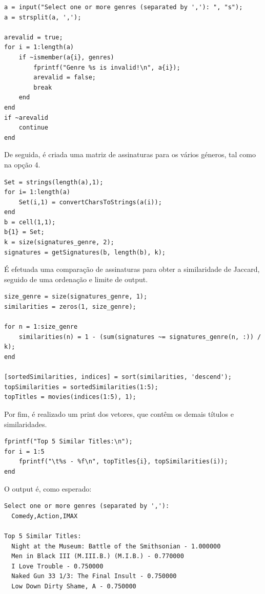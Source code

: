 \documentclass[portuguese, 11pt, a4paper,titlepage, oneside]{article}
\begin{document}
\begin{lstlisting}[style=Matlab-editor]
a = input("Select one or more genres (separated by ','): ", "s");
a = strsplit(a, ',');

arevalid = true;
for i = 1:length(a)
    if ~ismember(a{i}, genres)
        fprintf("Genre %s is invalid!\n", a{i});
        arevalid = false;
        break
    end
end
if ~arevalid
    continue
end
\end{lstlisting}

De seguida, é criada uma matriz de assinaturas para os vários géneros, tal como na opção 4.
\begin{lstlisting}[style=Matlab-editor]
Set = strings(length(a),1);
for i= 1:length(a)
    Set(i,1) = convertCharsToStrings(a(i));
end
b = cell(1,1);
b{1} = Set;
k = size(signatures_genre, 2);
signatures = getSignatures(b, length(b), k);
\end{lstlisting}

É efetuada uma comparação de assinaturas para obter a similaridade de Jaccard, seguido de uma ordenação e limite de output.
\begin{lstlisting}[style=Matlab-editor]
size_genre = size(signatures_genre, 1);
similarities = zeros(1, size_genre);

for n = 1:size_genre
    similarities(n) = 1 - (sum(signatures ~= signatures_genre(n, :)) / k);
end

[sortedSimilarities, indices] = sort(similarities, 'descend');
topSimilarities = sortedSimilarities(1:5);
topTitles = movies(indices(1:5), 1);
\end{lstlisting}

Por fim, é realizado um print dos vetores, que contêm os demais títulos e similaridades.
\begin{lstlisting}[style=Matlab-editor]
fprintf("Top 5 Similar Titles:\n");
for i = 1:5
    fprintf("\t%s - %f\n", topTitles{i}, topSimilarities(i));
end
\end{lstlisting}

O output é, como esperado:
\begin{lstlisting}[style=Matlab-editor]
Select one or more genres (separated by ','): 
  Comedy,Action,IMAX

Top 5 Similar Titles:
  Night at the Museum: Battle of the Smithsonian - 1.000000
  Men in Black III (M.III.B.) (M.I.B.) - 0.770000
  I Love Trouble - 0.750000
  Naked Gun 33 1/3: The Final Insult - 0.750000
  Low Down Dirty Shame, A - 0.750000
\end{lstlisting}
\end{document}

